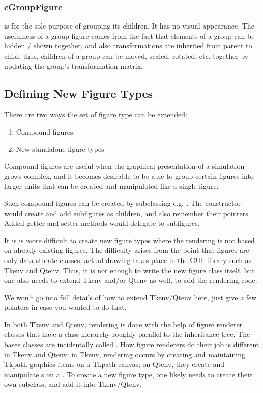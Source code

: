 \subsubsection{cGroupFigure}

 is for the sole purpose of grouping its children. It
has no visual appearance. The usefulness of a group figure comes from the
fact that elements of a group can be hidden / shown together, and also
transformations are inherited from parent to child, thus, children of a
group can be moved, scaled, rotated, etc. together by updating the group's
transformation matrix.


\subsection{Defining New Figure Types}

There are two ways the set of figure type can be extended:

\begin{enumerate}
  \item Compound figures.
  \item New standalone figure types
\end{enumerate}

Compound figures are useful when the graphical presentation of a simulation
grows complex, and it becomes desirable to be able to group certain figures
into larger units that can be created and manipulated like a single figure.

Such compound figures can be created by subclassing e.g. .
The constructor would create and add subfigures as children, and also remember
their pointers. Added getter and setter methods would delegate to subfigures.

It is is more difficult to create new figure types where the rendering is not
based on already existing figures. The difficulty arises from the point that
figures are only data storate classes, actual drawing takes place in the
GUI library such as Tkenv and Qtenv. Thus, it is not enough to write the new
figure class itself, but one also needs to extend Tkenv and/or Qtenv as well,
to add the rendering code.

We won't go into full details of how to extend Tkenv/Qtenv here, just give
a few pointers in case you wanted to do that.

In both Tkenv and Qtenv, rendering is done with the help of figure renderer
classes that have a class hierarchy roughly parallel to the
 inheritance tree. The bases classes are incidentally
called . How figure renderers do their job is
different in Tkenv and Qtenv: in Tkenv, rendering occurs by creating and
maintaining Tkpath graphics items on a Tkpath canvas; on Qtenv, they create
and manipulate s on a .
To create a new figure type, one likely needs to create their own
 subclass, and add it into Tkenv/Qtenv.

